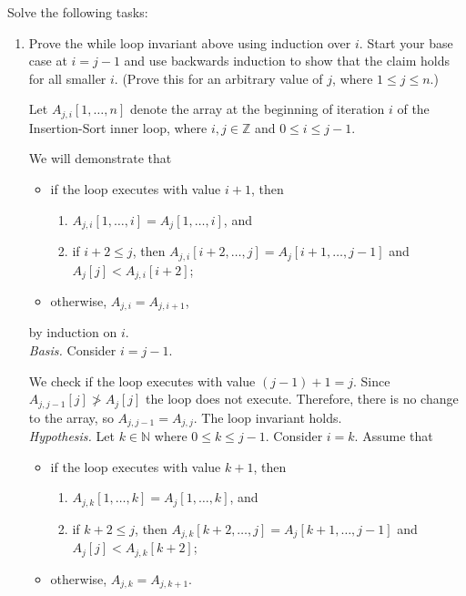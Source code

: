 Solve the following tasks:
\begin{enumerate}
	\item Prove the while loop invariant above using induction over $i$. Start your base case at $i=j-1$ and use backwards induction to show that the claim holds for all smaller $i$. (Prove this for an arbitrary value of $j$,
 where $1 \leq j \leq n$.)
	
\begin{solution}
Let $A_{j,i}[1,\dots,n]$ denote the array at the beginning of iteration $i$ of the Insertion-Sort inner loop, where $i,j\in\mathbb{Z}$ and $0\leq i\leq j-1$.

We will demonstrate that
\begin{itemize}
    \item if the loop executes with value $i+1$, then 
    \begin{enumerate}[nosep]
    \item$A_{j,i}[1,\ldots,i] = A_j[1,\ldots,i]$, and
    \item if $i+2\leq j$, then $A_{j,i}[i+2,\ldots,j] = A_j[i+1,\ldots,j-1]$ and $A_j[j] < A_{j,i}[i+2]$;
\end{enumerate}
\item otherwise, $A_{j,i} = A_{j,i+1}$,
\end{itemize}
by induction on $i$.\\

\textit{Basis. }Consider $i=j-1$.

We check if the loop executes with value $(j-1)+1=j$. Since $A_{j,j-1}[j]\ngtr A_j[j]$  the loop does not execute. Therefore, there is no change to the array, so $A_{j,j-1}=A_{j,j}$. The loop invariant holds.
\\

\textit{Hypothesis. }Let $k\in\mathbb{N}$ where $0\leq k\leq j-1$. Consider $i=k$. Assume that
\begin{itemize}
    \item if the loop executes with value $k+1$, then 
    \begin{enumerate}[nosep]
    \item$A_{j,k}[1,\ldots,k] = A_j[1,\ldots,k]$, and
    \item if $k+2\leq j$, then $A_{j,k}[k+2,\ldots,j] = A_j[k+1,\ldots,j-1]$ and $A_j[j] < A_{j,k}[k+2]$;
\end{enumerate}
\item otherwise, $A_{j,k} = A_{j,k+1}$.
\end{itemize}


\end{solution}
\end{enumerate}
